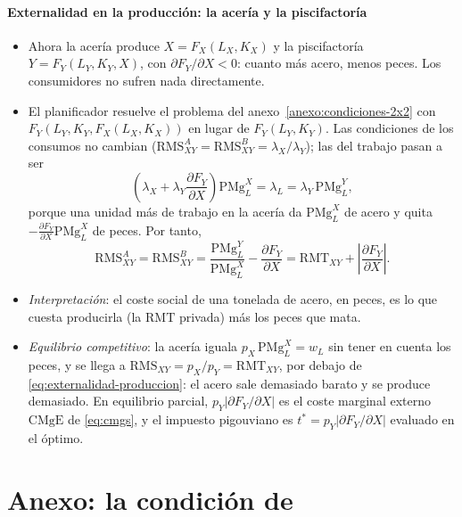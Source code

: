 \documentclass[11pt]{article}
\begin{document}
\paragraph{Externalidad en la producción: la acería y la piscifactoría}
\begin{itemize}
\item Ahora la acería produce $X=F_X(L_X,K_X)$ y la piscifactoría $Y=F_Y(L_Y,K_Y,X)$, con $\partial F_Y/\partial X<0$: cuanto más acero, menos peces. Los consumidores no sufren nada directamente.
\item El planificador resuelve el problema del anexo~\ref{anexo:condiciones-2x2} con $F_Y(L_Y,K_Y,F_X(L_X,K_X))$ en lugar de $F_Y(L_Y,K_Y)$. Las condiciones de los consumos no cambian ($\mathrm{RMS}^A_{XY}=\mathrm{RMS}^B_{XY}=\lambda_X/\lambda_Y$); las del trabajo pasan a ser
  $$\left(\lambda_X+\lambda_Y\frac{\partial F_Y}{\partial X}\right)\mathrm{PMg}^X_L=\lambda_L=\lambda_Y\,\mathrm{PMg}^Y_L,$$
  porque una unidad más de trabajo en la acería da $\mathrm{PMg}^X_L$ de acero y quita $-\frac{\partial F_Y}{\partial X}\mathrm{PMg}^X_L$ de peces. Por tanto,
  \begin{equation}\label{eq:externalidad-produccion}
  \mathrm{RMS}^A_{XY}=\mathrm{RMS}^B_{XY}=\frac{\mathrm{PMg}^Y_L}{\mathrm{PMg}^X_L}-\frac{\partial F_Y}{\partial X}=\mathrm{RMT}_{XY}+\left|\frac{\partial F_Y}{\partial X}\right|.
  \end{equation}
\item \emph{Interpretación}: el coste social de una tonelada de acero, en peces, es lo que cuesta producirla (la $\mathrm{RMT}$ privada) más los peces que mata.~\findemo
\item \emph{Equilibrio competitivo}: la acería iguala $p_X\,\mathrm{PMg}^X_L=w_L$ sin tener en cuenta los peces, y se llega a $\mathrm{RMS}_{XY}=p_X/p_Y=\mathrm{RMT}_{XY}$, por debajo de \eqref{eq:externalidad-produccion}: el acero sale demasiado barato y se produce demasiado. En equilibrio parcial, $p_Y\left|\partial F_Y/\partial X\right|$ es el coste marginal externo $\mathrm{CMgE}$ de \eqref{eq:cmgs}, y el impuesto pigouviano es $t^*=p_Y\left|\partial F_Y/\partial X\right|$ evaluado en el óptimo.
\end{itemize}

\section{Anexo: la condición de }\label{anexo:samuelson}
\end{document}

